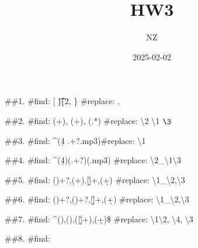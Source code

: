 \documentclass[
]{article}
\title{HW3}
\author{NZ}
\date{2025-02-02}
\begin{document}
\maketitle

\#\#1. \#find: {[} \t]\{2, \} \#replace: ,

\#\#2. \#find: (\w+), (\w+), (.*) \#replace: \textbackslash2
\textbackslash1 \(\3\)

\#\#3. \#find: \^{}\s*(\d{4} .+?.mp3)\s* \#replace: \textbackslash1\n

\#\#4. \#find: \^{}\s*(\d{4})\s(.+?)(.mp3) \#replace:
\textbackslash2\_\textbackslash1\textbackslash3

\#\#5. \#find: (\w)\w+?,(\w+),{[}\d\.]+,(\d+) \#replace:
\textbackslash1\_\textbackslash2,\textbackslash3

\#\#6. \#find: (\w)\w+?,()\w+?,{[}\d\.]+,(\d+) \#replace:
\textbackslash1\_\textbackslash2,\textbackslash3

\#\#7. \#find: \^{}()\w*,()\w*,({[}\d\.]+),(\d+)\$ \#replace:
\textbackslash1\textbackslash2, \textbackslash4, \textbackslash3

\#\#8. \#find:
\end{document}
